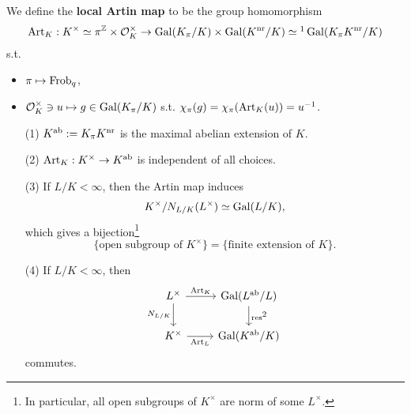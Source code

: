 We define the \textbf{local Artin map} to be the group homomorphism
\[\art_K : K^\times\simeq \pi^\Z\times \O_K^\times\to \gal(K_\pi/K)\times\gal(K^\nr/K)\simeq\footnotemark\gal(K_\pi K^\nr/K)\]
s.t.\begin{itemize}
    \item $\pi\mapsto \operatorname{Frob}_q$,
    \item $\mathcal{O}_K^\times\ni u\mapsto g\in\operatorname{Gal}(K_\pi/K)$ s.t. $\chi_\pi(g) = \chi_\pi(\operatorname{Art}_K(u)) = u^{-1}$.
\end{itemize}
\begin{theorem}
    \begin{enumerate}
        \item [(1)] $K^{\mathrm{ab}} := K_\pi K^{\mathrm{nr}}$ is the maximal abelian extension of $K$.
        \item [(2)] $\operatorname{Art}_K : K^\times\to K^{\mathrm{ab}}$ is independent of all choices.
        \item [(3)] If $L/K < \infty$, then the Artin map induces \[K^\times/N_{L/K}(L^\times)\simeq\operatorname{Gal}(L/K),\]
        which gives a bijection\footnote{
            In particular, all open subgroups of $K^\times$ are norm of some $L^\times$.
        }\[\{\text{open subgroup of }K^\times\} = \{\text{finite extension of }K\}.\]
        \item [(4)] If $L/K < \infty$,
        then %
        \[\begin{tikzcd}
            {L^\times} & {\gal(L^\ab/L)} \\
            {K^\times} & {\gal(K^\ab/K)}
            \arrow["{\art_K}", from=1-1, to=1-2]
            \arrow["{N_{L/K}}"', from=1-1, to=2-1]
            \arrow["{\mathrm{res}}\footnotemark", from=1-2, to=2-2]
            \arrow["{\art_L}"', from=2-1, to=2-2]
        \end{tikzcd}\]commutes.
    \end{enumerate}
\end{theorem}

